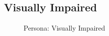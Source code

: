 \documentclass[a4paper,12pt]{report}
\begin{document}
\subsection{Visually Impaired}
\begin{figure}[!htb]
	\caption{\label{fig:visually_impaired}Persona: Visually Impaired}	
\end{figure}

\FloatBarrier
\end{document}
